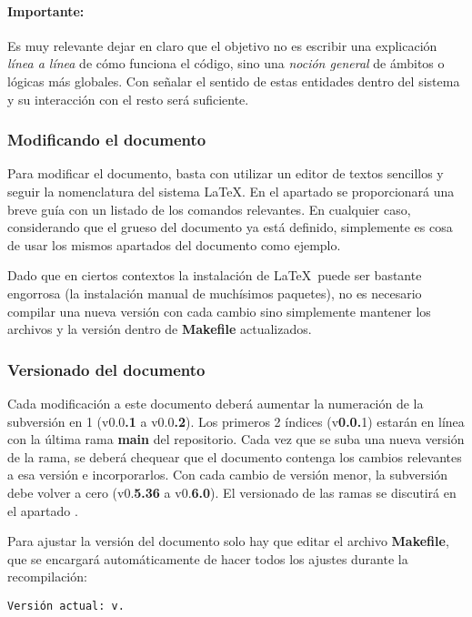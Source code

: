 \paragraph*{Importante:}
Es muy relevante dejar en claro que el objetivo no es escribir una explicación \emph{línea a línea} de cómo funciona el código, sino una \emph{noción general} de ámbitos o lógicas más globales. Con señalar el sentido de estas entidades dentro del sistema y su interacción con el resto será suficiente.

\subsubsection{Modificando el documento}\label{flujo:modificando-el-documento}
Para modificar el documento, basta con utilizar un editor de textos sencillos y seguir la nomenclatura del sistema \LaTeX. En el apartado  se proporcionará una breve guía con un listado de los comandos relevantes. En cualquier caso, considerando que el grueso del documento ya está definido, simplemente es cosa de usar los mismos apartados del documento como ejemplo.

Dado que en ciertos contextos la instalación de \LaTeX\ puede ser bastante engorrosa (la instalación manual de muchísimos paquetes), no es necesario compilar una nueva versión con cada cambio sino simplemente mantener los archivos  y la versión dentro de \textbf{Makefile} actualizados.

\subsubsection{Versionado del documento}\label{flujo:versionado-del-documento}
Cada modificación a este documento deberá aumentar la numeración de la subversión en 1 (v0.0\textbf{.1} a v0.0\textbf{.2}). Los primeros 2 índices (v\textbf{0.0.}1) estarán en línea con la última rama \textbf{main} del repositorio. Cada vez que se suba una nueva versión de la rama, se deberá chequear que el documento contenga los cambios relevantes a esa versión e incorporarlos. Con cada cambio de versión menor, la subversión debe volver a cero (v0.\textbf{5.36} a v0.\textbf{6.0}). El versionado de las ramas se discutirá en el apartado .

Para ajustar la versión del documento solo hay que editar el archivo \textbf{Makefile}, que se encargará automáticamente de hacer todos los ajustes durante la recompilación:
\begin{center}
\texttt{Versión actual: v\docversion.}
\end{center}

